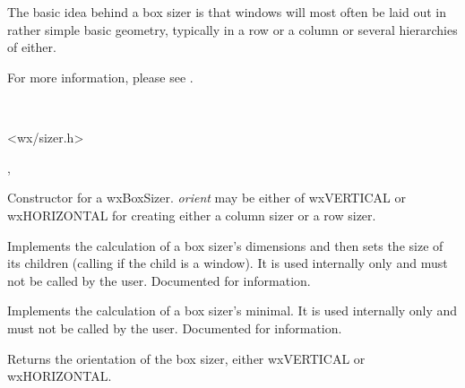 \section{}\label{wxboxsizer}

The basic idea behind a box sizer is that windows will most often be laid out in rather
simple basic geometry, typically in a row or a column or several hierarchies of either.

For more information, please see .


\\


<wx/sizer.h>


, 

\label{wxboxsizerwxboxsizer}


Constructor for a wxBoxSizer. {\it orient} may be either of wxVERTICAL
or wxHORIZONTAL for creating either a column sizer or a row sizer.

\label{wxboxsizerrecalcsizes}


Implements the calculation of a box sizer's dimensions and then sets
the size of its children (calling  
if the child is a window). It is used internally only and must not be called
by the user. Documented for information.

\label{wxboxsizercalcmin}


Implements the calculation of a box sizer's minimal. It is used internally
only and must not be called by the user. Documented for information.

\label{wxboxsizergetorientation}


Returns the orientation of the box sizer, either wxVERTICAL
or wxHORIZONTAL.

